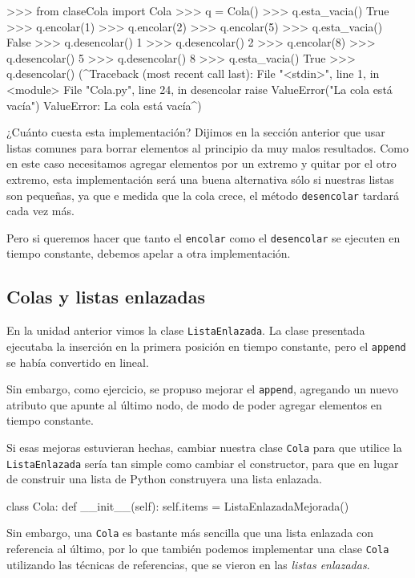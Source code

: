 \begin{codigo-python-sn}
>>> from claseCola import Cola
>>> q = Cola()
>>> q.esta_vacia()
True
>>> q.encolar(1)
>>> q.encolar(2)
>>> q.encolar(5)
>>> q.esta_vacia()
False
>>> q.desencolar()
1
>>> q.desencolar()
2
>>> q.encolar(8)
>>> q.desencolar()
5
>>> q.desencolar()
8
>>> q.esta_vacia()
True
>>> q.desencolar()
(^Traceback (most recent call last):
  File "<stdin>", line 1, in <module>
  File "Cola.py", line 24, in desencolar
    raise ValueError("La cola está vacía")
ValueError: La cola está vacía^)
\end{codigo-python-sn}

¿Cuánto cuesta esta implementación?  Dijimos en la sección anterior que
usar listas comunes para borrar elementos al principio da muy malos
resultados. Como en este caso necesitamos agregar elementos por un extremo
y quitar por el otro extremo, esta implementación será una buena
alternativa sólo si nuestras listas son pequeñas, ya que e medida que la
cola crece, el método \lstinline!desencolar! tardará cada vez más.

Pero si queremos hacer que tanto el \lstinline!encolar! como el
\lstinline!desencolar!  se ejecuten en tiempo constante, debemos apelar a
otra implementación.

\subsection{Colas y listas enlazadas}

En la unidad anterior vimos la clase \lstinline!ListaEnlazada!.
La clase presentada ejecutaba la inserción en la primera posición en
tiempo constante, pero el \lstinline|append| se había convertido en lineal.

Sin embargo, como ejercicio, se propuso mejorar el \lstinline|append|,
agregando un nuevo atributo que apunte al último nodo, de modo de poder
agregar elementos en tiempo constante.

Si esas mejoras estuvieran hechas, cambiar nuestra clase \lstinline!Cola!
para que utilice la \lstinline!ListaEnlazada! sería tan simple como cambiar
el constructor, para que en lugar de construir una lista de Python
construyera una lista enlazada.

\begin{codigo-python-sn}
class Cola:
    def __init__(self):
        self.items = ListaEnlazadaMejorada()
\end{codigo-python-sn}

Sin embargo, una \lstinline!Cola! es bastante más sencilla que una
lista enlazada con referencia al último, por lo que también podemos
implementar una clase \lstinline!Cola! utilizando las técnicas de referencias,
que se vieron en las \emph{listas enlazadas}.

